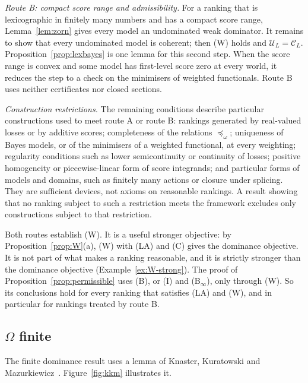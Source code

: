 \documentclass[11pt]{article}
\theoremstyle{definition}
\theoremstyle{remark}
\newcommand{\C}{\mathcal C}
\newcommand{\U}{\mathcal U}
\begin{document}
\emph{Route B: compact score range and admissibility.} For a ranking that is lexicographic in finitely many numbers and has a compact score range, Lemma~\ref{lem:zorn} gives every model an undominated weak dominator. It remains to show that every undominated model is coherent; then (W) holds and $\U_L=\C_L$. Proposition~\ref{prop:lexbayes} is one lemma for this second step. When the score range is convex and some model has first-level score zero at every world, it reduces the step to a check on the minimisers of weighted functionals. Route B uses neither certificates nor closed sections.

\emph{Construction restrictions.} The remaining conditions describe particular constructions used to meet route A or route B: rankings generated by real-valued losses or by additive scores; completeness of the relations $\preceq_\omega$; uniqueness of Bayes models, or of the minimisers of a weighted functional, at every weighting; regularity conditions such as lower semicontinuity or continuity of losses; positive homogeneity or piecewise-linear form of score integrands; and particular forms of models and domains, such as finitely many actions or closure under splicing. They are sufficient devices, not axioms on reasonable rankings. A result showing that no ranking subject to such a restriction meets the framework excludes only constructions subject to that restriction.

Both routes establish (W). It is a useful stronger objective: by Proposition~\ref{prop:W}(a), (W) with (LA) and (C) gives the dominance objective. It is not part of what makes a ranking reasonable, and it is strictly stronger than the dominance objective (Example~\ref{ex:W-strong}). The proof of Proposition~\ref{prop:permissible} uses (B), or (I) and (B$_\infty$), only through (W). So its conclusions hold for every ranking that satisfies (LA) and (W), and in particular for rankings treated by route B.

\subsection{\texorpdfstring{$\Omega$}{Omega} finite}\label{sec:kkm}
The finite dominance result uses a lemma of Knaster, Kuratowski and Mazurkiewicz~\cite{KKM}. Figure~\ref{fig:kkm} illustrates it.
\end{document}
